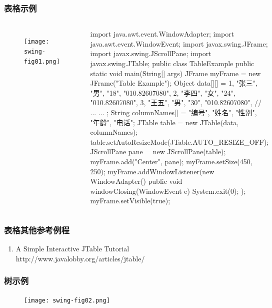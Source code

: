 \begin{frame}[fragile] %
\frametitle{表格示例}

\begin{columns}
\begin{figure}
\centering
\texttt{[image: swing-fig01.png]}
\end{figure}

\begin{javaCode}
import java.awt.event.WindowAdapter;
import java.awt.event.WindowEvent;
import javax.swing.JFrame;
import javax.swing.JScrollPane;
import javax.swing.JTable;
public class TableExample {
  public static void main(String[] args) {
    JFrame myFrame = new JFrame("Table Example");
    Object data[][] = {
      {1, "张三", "男", "18", "010.82607080"},
      {2, "李四", "女", "24", "010.82607080"},
      {3, "王五", "男", "30", "010.82607080"},
      // ... ...
    };
    String columnNames[] = {
      "编号", "姓名", "性别", "年龄", "电话"};
    JTable table = new JTable(data, columnNames);
    table.setAutoResizeMode(JTable.AUTO_RESIZE_OFF);
    JScrollPane pane = new JScrollPane(table);
    myFrame.add("Center", pane);
    myFrame.setSize(450, 250);
    myFrame.addWindowListener(new WindowAdapter(){
      public void windowClosing(WindowEvent e) {
        System.exit(0);
      }
    });
    myFrame.setVisible(true);
  }
}
\end{javaCode}
\end{columns}
\end{frame}

\begin{frame}[fragile] %
\frametitle{表格其他参考例程}
\begin{enumerate}
\item A Simple Interactive JTable Tutorial\\
http://www.javalobby.org/articles/jtable/
\end{enumerate}

\end{frame}
\begin{frame}[fragile] %
\frametitle{树示例}

\begin{figure}
\centering
\texttt{[image: swing-fig02.png]}
\end{figure}

\end{frame}

